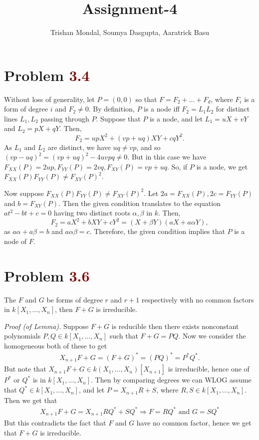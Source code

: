 \documentclass[12pt]{article}
\title{\textbf{Assignment-4}}
\author{Trishan Mondal, Soumya Dasgupta, Aaratrick Basu}
\date{}
\begin{document}
\maketitle

\section{Problem \textcolor{maroon}{3.4}}
Without loss of generality, let \( P = (0,0) \) so that \( F = F_2 + \dots + F_d \), where \( F_i \) is a form of degree \( i \) and \( F_2 \neq 0 \). By definition, \( P \) is a node iff \( F_2 = L_1L_2 \) for distinct lines \( L_1, L_2 \) passing through \( P \). Suppose that \( P \) is a node, and let \( L_1 = uX+vY \) and \( L_2=pX+qY \). Then,
\[
    F_2 = upX^2 + (vp+uq)XY + cqY^2.
\]
As \( L_1  \) and \( L_2 \) are distinct, we have \( uq \neq vp \), and so \( (vp-uq)^2 = (vp+uq)^2 - 4uvpq \neq 0 \). But in this case we have \( F_{XX}(P) = 2up, F_{YY}(P) = 2vq, F_{XY}(P) = vp+uq \). So, if \( P \) is a node, we get \( F_{XX}(P)F_{YY}(P) \neq F_{XY}(P)^2 \).
\smallskip

Now suppose \( F_{XX}(P)F_{YY}(P) \neq F_{XY}(P)^2 \). Let \( 2a = F_{XX}(P), 2c = F_{YY}(P) \) and \( b = F_{XY}(P) \). Then the given condition translates to the equation \( at^2-bt+c=0 \) having two distinct roots \( \alpha, \beta \) in \( k \). Then,
\[
    F_2 = aX^2+bXY+cY^2 = (X+\beta Y)(aX+a\alpha Y),
\]
as \( a\alpha + a\beta = b \) and \( a\alpha \beta = c \). Therefore, the given condition implies that \( P \) is a node of \( F \).

\section{Problem \textcolor{maroon}{3.6}}
\begin{Lem}{1} The $F$ and $G$ be forms of degree $r$ and $r+1$ respectively with no common factors in $k[X_1,\dots,X_n]$, then $F + G$ is irreducible.
\end{Lem}

\textit{Proof (of Lemma).} Suppose $F + G$ is reducible then there exists nonconstant polynomials $P,Q \in k[X_1,\dots,X_n]$ such that $F + G = PQ$. Now we consider the homogeneous both of these to get
\begin{align*}
    X_{n+1} F + G = (F + G)^* = (PQ)^* = P^* Q^*.
\end{align*}
But note that $X_{n+1} F + G \in k(X_1,\dots,X_n)[X_{n+1}]$ is irreducible, hence one of $P^*$ or $Q^*$ is in $k[X_1,\dots,X_n]$. Then by comparing degrees we can WLOG assume that $Q^* \in k[X_1,\dots,X_n]$, and let $P = X_{n+1} R + S$, where $R , S \in k[X_1,\dots,X_n]$. Then we get that
\begin{align*}
    X_{n+1} F + G = X_{n+1} R Q^* + S Q^* \Rightarrow F = R Q^* \mbox{ and } G = S Q^*
\end{align*}
But this contradicts the fact that $F$ and $G$ have no common factor, hence we get that $F + G$ is irreducible.
\end{document}
